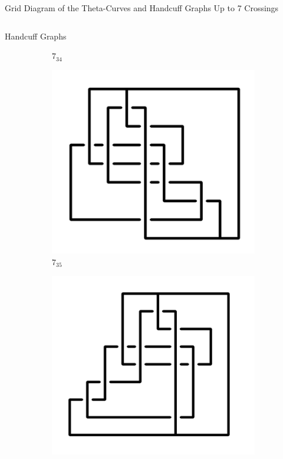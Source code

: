 \documentclass[final]{beamer}
\begin{document}
\begin{frame}[t]
\begin{alertblock}{Grid Diagram of the Theta-Curves and Handcuff Graphs Up to 7 Crossings}
\begin{columns}[t]
\begin{column}{0.5\textwidth}
\begin{alertblock}{Handcuff Graphs}
\begin{figure}
\begin{subfigure}{0.075\textwidth}
    \caption{$7_{34}$} 
    \end{subfigure}
    \begin{subfigure}{0.075\textwidth}
    \includegraphics[width=\columnwidth]{../Midterm_Poster/grid_diagram/handcuff_7_35.png}
    \caption{$7_{35}$} 
    \end{subfigure}
    \begin{subfigure}{0.075\textwidth}
    \includegraphics[width=\columnwidth]{../Midterm_Poster/grid_diagram/handcuff_7_36.png}

\end{subfigure}
\end{figure}
\end{alertblock}
\end{column}
\end{columns}
\end{alertblock}
\end{frame}
\end{document}
